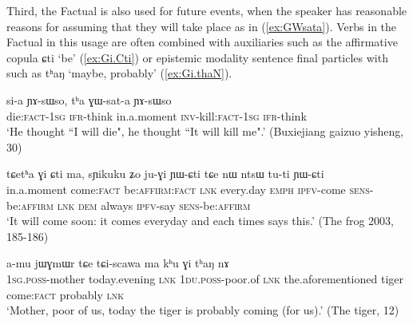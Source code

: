 \documentclass[oldfontcommands,oneside,a4paper,11pt]{article}
\newcommand{\ipa}[1]{{\phon \mbox{#1}}} %
\newcommand{\refb}[1]{(\ref{#1})}
\newcommand{\factual}[1]{\textsc{:fact}}
\begin{document}
Third, the Factual is also used for future events, when the speaker has reasonable reasons for assuming that they will take place as in \refb{ex:GWsata}. Verbs in the Factual in this usage are often combined with auxiliaries such as the affirmative copula \ipa{ɕti} `be' (\ref{ex:Gi.Cti}) or epistemic modality sentence final particles with  such as \ipa{tʰaŋ} `maybe, probably' (\ref{ex:Gi.thaN}).

\begin{exe}
\ex \label{ex:GWsata}
\gll
\ipa{si-a}   \ipa{ɲɤ-sɯso,} \ipa{tʰa}  	\ipa{ɣɯ-sat-a}  \ipa{ɲɤ-sɯso} \\
die:\textsc{fact-1sg} \textsc{ifr}-think in.a.moment \textsc{inv}-kill:\textsc{fact-1sg} \textsc{ifr}-think \\
\glt `He thought ``I will die", he thought ``It will kill me".' (Buxiejiang gaizuo yisheng, 30)
\end{exe}

\begin{exe}
\ex \label{ex:Gi.Cti}
\gll
 	\ipa{tɕetʰa} 	\ipa{ɣi} 	\ipa{ɕti} 	\ipa{ma,} 	\ipa{sɲikuku} 	\ipa{ʑo} 	\ipa{ju-ɣi} \ipa{ɲɯ-ɕti}	\ipa{tɕe} 	\ipa{nɯ} 	\ipa{ntsɯ} 	\ipa{tu-ti} 	\ipa{ɲɯ-ɕti} 	\\
 in.a.moment come\factual{} be:\textsc{affirm}\factual{} \textsc{lnk} every.day \textsc{emph} \textsc{ipfv}-come \textsc{sens}-be:\textsc{affirm} \textsc{lnk} \textsc{dem} always \textsc{ipfv}-say \textsc{sens}-be:\textsc{affirm} \\
\glt `It will come  soon: it comes everyday and each times says this.' (The frog 2003, 185-186)
\end{exe}

\begin{exe}
\ex \label{ex:Gi.thaN}
\gll
 \ipa{a-mu} \ipa{jɯɣmɯr} 	\ipa{tɕe} 	\ipa{tɕi-scawa} 	\ipa{ma} 	\ipa{kʰu} 	\ipa{ɣi} 	\ipa{tʰaŋ} 	\ipa{nɤ} 	\\
 \textsc{1sg.poss}-mother today.evening \textsc{lnk}  \textsc{1du.poss}-poor.of \textsc{lnk} the.aforementioned tiger  come\factual{} probably \textsc{lnk} \\
\glt `Mother, poor of us, today the tiger is probably coming (for us).' (The tiger, 12)
 \end{exe}

 

 
\end{document}
